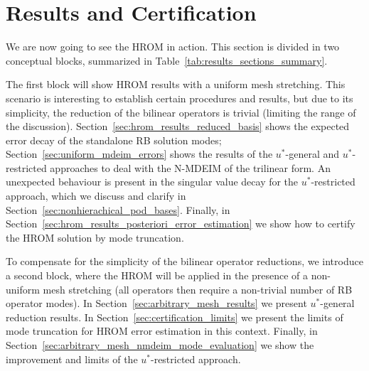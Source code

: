 \documentclass[../../thesis.tex]{subfiles}
\begin{document}
\section{Results and Certification}
\label{sec:results_and_certification}
We are now going to see the HROM in action.
This section is divided in two conceptual blocks, 
summarized in Table~\ref{tab:results_sections_summary}.

The first block will show HROM results with a uniform mesh stretching.
This scenario is interesting to establish certain procedures and results,
but due to its simplicity, the reduction of the bilinear operators is trivial
(limiting the range of the discussion).
Section~\ref{sec:hrom_results_reduced_basis} shows 
the expected error decay of the standalone RB solution modes;
Section~\ref{sec:uniform_mdeim_errors} shows the results 
of the $u^{*}$-general and $u^{*}$-restricted approaches 
to deal with the N-MDEIM of the trilinear form.
An unexpected behaviour is present in the singular value decay 
for the $u^{*}$-restricted approach, 
which we discuss and clarify in Section~\ref{sec:nonhierachical_pod_bases}.
Finally, in Section~\ref{sec:hrom_results_posteriori_error_estimation} we show 
how to certify the HROM solution by mode truncation.

To compensate for the simplicity of the bilinear operator reductions, 
we introduce a second block,
where the HROM will be applied in the presence of a non-uniform mesh stretching
(all operators then require a non-trivial number of RB operator modes). 
In Section~\ref{sec:arbitrary_mesh_results} 
we present $u^{*}$-general reduction results.
In Section~\ref{sec:certification_limits} 
we present the limits of mode truncation
for HROM error estimation in this context.
Finally, in Section~\ref{sec:arbitrary_mesh_nmdeim_mode_evaluation} we show
the improvement and limits of the $u^{*}$-restricted approach.
\end{document}

